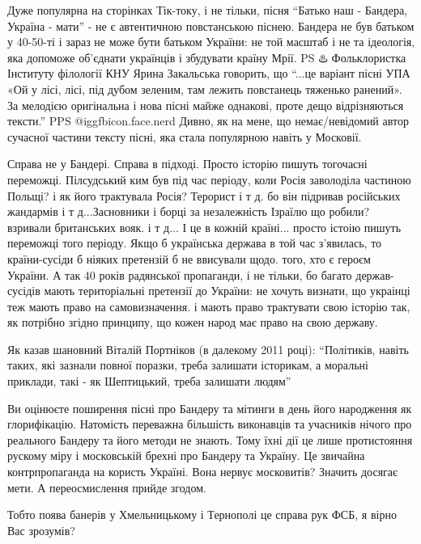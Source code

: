  
 
 
 
 
\zzSecCmt

\begin{itemize} %

Дуже популярна на сторінках Тік-току, і не тільки, пісня \enquote{Батько наш -
Бандера, Україна - мати} - не є автентичною повстанською піснею. Бандера не був
батьком у 40-50-ті і зараз не може бути батьком України: не той масштаб і не та
ідеологія, яка допоможе об'єднати українців і збудувати країну Мрії. PS ♨️
Фольклористка Інституту філології КНУ Ярина Закальська говорить, що
\enquote{...це варіант пісні УПА «Ой у лісі, лісі, під дубом зеленим, там
лежить повстанець тяженько ранений». За мелодією оригінальна і нова пісні майже
однакові, проте дещо відрізняються тексти.} PPS @igg{fbicon.face.nerd} Дивно,
як на мене, що немає/невідомий автор сучасної частини тексту пісні, яка стала
популярною навіть у Московії.


Справа не у Бандері. Справа в підході. Просто історію пишуть тогочасні
переможці. Пілсудський ким був під час періоду, коли Росія заволоділа частиною
Польщі? і як його трактувала Росія? Терорист і т д. бо він підривав російських
жандармів і т д...Засновники і борці за незалежність Ізраїлю що робили?
взривали британських вояк. і т д... І це в кожній країні... просто істоію
пишуть переможці того періоду. Якщо б українська держава в той час з'явилась,
то країни-сусіди б ніяких претензій б не ввисували щодо. того, хто є героєм
України. А так 40 років радянської пропаганди, і не тільки, бо багато
держав-сусідів мають територіальні претензії до України: не хочуть визнати, що
украінці теж мають право на самовизначення. і мають право трактувати свою
історію так, як потрібно згідно принципу, що кожен народ має право на свою
державу.


Як казав шановний Віталій Портніков (в далекому 2011 році): \enquote{Політиків, навіть
таких, які зазнали повної поразки, треба залишати історикам, а моральні
приклади, такі - як Шептицький, треба залишати людям}


Ви оцінюєте поширення пісні про Бандеру та мітинги в день його народження як
глорифікацію. Натомість переважна більшість виконавців та учасників нічого про
реального Бандеру та його методи не знають. Тому їхні дії це лише протистояння
рускому міру і московській брехні про Бандеру та Україну. Це звичайна
контрпропаганда на користь Україні. Вона нервує московитів? Значить досягає
мети. А переосмислення прийде згодом.



Тобто поява банерів у Хмельницькому і Тернополі це справа рук ФСБ, я вірно Вас
зрозумів?

\end{itemize} %
